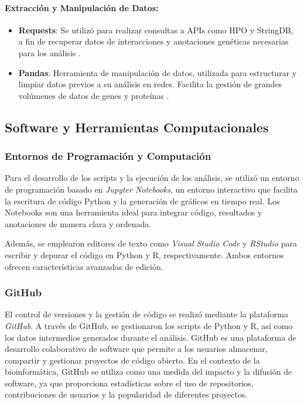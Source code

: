 \paragraph{Extracción y Manipulación de Datos:}
\begin{itemize}
	\item \textbf{Requests}: Se utilizó para realizar consultas a APIs como HPO y StringDB, a fin de recuperar datos de interacciones y anotaciones genéticas necesarias para los análisis \cite{Requests2020}.
	\item \textbf{Pandas}: Herramienta de manipulación de datos, utilizada para estructurar y limpiar datos previos a su análisis en redes. Facilita la gestión de grandes volúmenes de datos de genes y proteínas \cite{McKinney2010}.
\end{itemize}




\subsection{Software y Herramientas Computacionales}

\subsubsection{Entornos de Programación y Computación}
Para el desarrollo de los scripts y la ejecución de los análisis, se utilizó un entorno de programación basado en \textit{Jupyter Notebooks}, un entorno interactivo que facilita la escritura de código Python y la generación de gráficos en tiempo real. Los Notebooks son una herramienta ideal para integrar código, resultados y anotaciones de manera clara y ordenada.

Además, se emplearon editores de texto como \textit{Visual Studio Code} y \textit{RStudio} para escribir y depurar el código en Python y R, respectivamente. Ambos entornos ofrecen características avanzadas de edición.

\subsubsection{GitHub}
El control de versiones y la gestión de código se realizó mediante la plataforma \textit{GitHub}. A través de GitHub, se gestionaron los scripts de Python y R, así como los datos intermedios generados durante el análisis. GitHub es una plataforma de desarrollo colaborativo de software que permite a los usuarios almacenar, compartir y gestionar proyectos de código abierto. En el contexto de la bioinformática, GitHub se utiliza como una medida del impacto y la difusión de software, ya que proporciona estadísticas sobre el uso de repositorios, contribuciones de usuarios y la popularidad de diferentes proyectos\cite{dozmorov2018}. 


